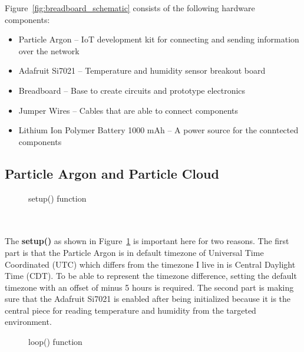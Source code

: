 \documentclass{article}
\begin{document}
Figure~\ref{fig:breadboard_schematic} consists of the following hardware components:

\begin{itemize}
	\item Particle Argon -- IoT development kit for connecting and sending information over the network
	\item Adafruit Si7021 -- Temperature and humidity sensor breakout board
	\item Breadboard -- Base to create circuits and prototype electronics
	\item Jumper Wires -- Cables that are able to connect components
	\item Lithium Ion Polymer Battery 1000 mAh -- A power source for the conntected components
\end{itemize}

\newpage

\subsection{Particle Argon and Particle Cloud}
\begin{minipage}[c]{\textwidth}
	\begin{figure}[H]
		
		\caption{setup() function}
		\label{fig:setup}
	\end{figure}
\end{minipage}\ \\\\

The \textbf{setup()} as shown in Figure~\ref{fig:setup} is important here for two reasons. The first part is that the Particle Argon is in default timezone of Universal Time Coordinated (UTC) which differs from the timezone I live in is Central Daylight Time (CDT). To be able to represent the timezone difference, setting the default timezone with an offset of minus 5 hours is required. The second part is making sure that the Adafruit Si7021 is enabled after being initialized because it is the central piece for reading temperature and humidity from the targeted environment.

\begin{minipage}[c]{\textwidth}
	\begin{figure}[H]
		
		\caption{loop() function}
		\label{fig:loop}
	\end{figure}
\end{minipage}\ \\\\
\end{document}

